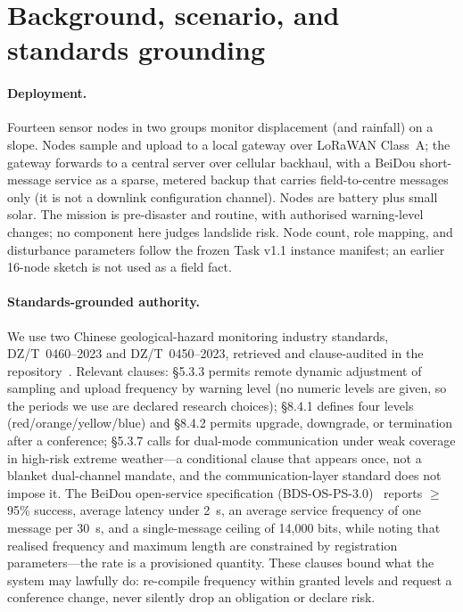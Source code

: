 \documentclass[11pt]{article}
\begin{document}
\section{Background, scenario, and standards grounding}
\label{sec:bg}

\paragraph{Deployment.}
Fourteen sensor nodes in two groups monitor displacement (and rainfall) on a slope. Nodes sample
and upload to a local gateway over LoRaWAN Class~A; the gateway forwards to a central server over
cellular backhaul, with a BeiDou short-message service as a sparse, metered backup that carries
field-to-centre messages only (it is not a downlink configuration channel). Nodes are battery plus
small solar. The mission is pre-disaster and routine, with authorised warning-level changes; no
component here judges landslide risk. Node count, role mapping, and disturbance parameters follow
the frozen Task v1.1 instance manifest; an earlier 16-node sketch is not used as a field fact.

\paragraph{Standards-grounded authority.}
We use two Chinese geological-hazard monitoring industry standards, DZ/T~0460--2023 and
DZ/T~0450--2023, retrieved and clause-audited in the repository~\cite{dzt0460,dzt0450}. Relevant
clauses: \S5.3.3 permits remote dynamic adjustment of sampling and upload frequency by warning
level (no numeric levels are given, so the periods we use are declared research choices);
\S8.4.1 defines four levels (red/orange/yellow/blue) and \S8.4.2 permits upgrade, downgrade, or
termination after a conference; \S5.3.7 calls for dual-mode communication under weak coverage in
high-risk extreme weather---a conditional clause that appears once, not a blanket dual-channel
mandate, and the communication-layer standard does not impose it. The BeiDou open-service
specification (BDS-OS-PS-3.0)~\cite{bdsps3} reports $\geq$95\% success, average latency under 2~s,
an average service frequency of one message per 30~s, and a single-message ceiling of 14{,}000
bits, while noting that realised frequency and maximum length are constrained by registration
parameters---the rate is a provisioned quantity. These clauses bound what the system may lawfully
do: re-compile frequency within granted levels and request a conference change, never silently
drop an obligation or declare risk.
\end{document}
